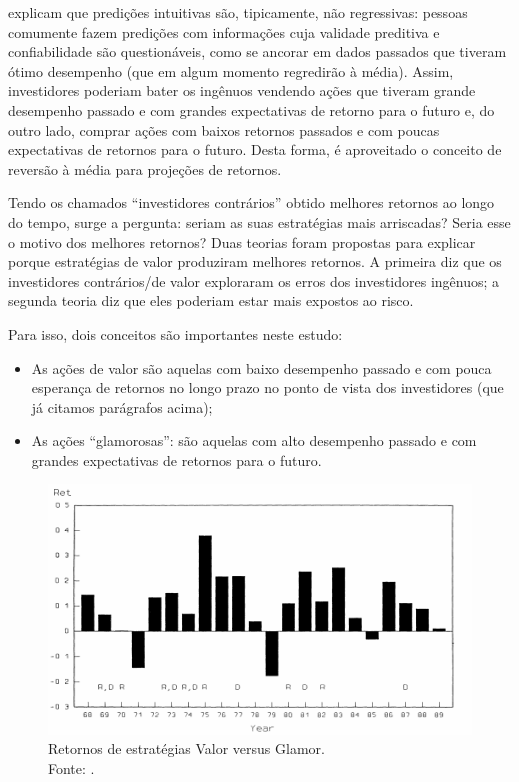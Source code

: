  explicam que predições intuitivas são, tipicamente, não regressivas: pessoas comumente fazem predições com informações cuja validade preditiva e confiabilidade são questionáveis, como se ancorar em dados passados que tiveram ótimo desempenho (que em algum momento regredirão à média). Assim, investidores poderiam bater os ingênuos vendendo ações que tiveram grande desempenho passado e com grandes expectativas de retorno para o futuro e, do outro lado, comprar ações com baixos retornos passados e com poucas expectativas de retornos para o futuro. Desta forma, é aproveitado o conceito de reversão à média para projeções de retornos.

Tendo os chamados “investidores contrários” obtido melhores retornos ao longo do tempo, surge a pergunta: seriam as suas estratégias mais arriscadas? Seria esse o motivo dos melhores retornos? Duas teorias foram propostas para explicar porque estratégias de valor produziram melhores retornos. A primeira diz que os investidores contrários/de valor exploraram os erros dos investidores ingênuos; a segunda teoria diz que eles poderiam estar mais expostos ao risco.

Para isso, dois conceitos são importantes neste estudo: 

\begin{itemize}
	\item As ações de valor são aquelas com baixo desempenho passado e com pouca esperança de retornos no longo prazo no ponto de vista dos investidores (que já citamos parágrafos acima);
	\item As ações “glamorosas”: são aquelas com alto desempenho passado e com grandes expectativas de retornos para o futuro.
\end{itemize}

\begin{figure}
	\centering
	\includegraphics[width=1\linewidth]{figs/fig_comp_value}
	\caption[Retornos de estratégias Valor versus Glamor]{Retornos de estratégias Valor versus Glamor.\\ Fonte: .}
	\label{fig:figcompvalue}
\end{figure}

